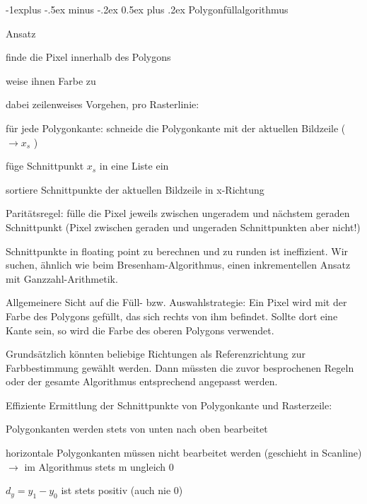 \documentclass[landscape]{article}
\makeatletter
\renewcommand{\subsection}{\@startsection{subsection}{2}{0mm}%
                                {-1explus -.5ex minus -.2ex}%
                                {0.5ex plus .2ex}%
                                {\normalfont\normalsize\bfseries}}
\makeatother
\begin{document}
\begin{multicols}{3}
  
  \subsection{ Polygonfüllalgorithmus}
  \begin{itemize*}
    \item Ansatz
          \begin{itemize*}
            \item finde die Pixel innerhalb des Polygons
            \item weise ihnen Farbe zu
            \item dabei zeilenweises Vorgehen, pro Rasterlinie:
            \item für jede Polygonkante: schneide die Polygonkante mit der aktuellen Bildzeile ($\rightarrow x_s$ )
            \item füge Schnittpunkt $x_s$ in eine Liste ein
            \item sortiere Schnittpunkte der aktuellen Bildzeile in x-Richtung
            \item Paritätsregel: fülle die Pixel jeweils zwischen ungeradem und nächstem geraden Schnittpunkt (Pixel zwischen geraden und ungeraden Schnittpunkten aber nicht!)
          \end{itemize*}
    \item Schnittpunkte in floating point zu berechnen und zu runden ist ineffizient. Wir suchen, ähnlich wie beim Bresenham-Algorithmus, einen inkrementellen Ansatz mit Ganzzahl-Arithmetik.
    \item Allgemeinere Sicht auf die Füll- bzw. Auswahlstrategie: Ein Pixel wird mit der Farbe des Polygons gefüllt, das sich rechts von ihm befindet. Sollte dort eine Kante sein, so wird die Farbe des oberen Polygons verwendet.
    \item Grundsätzlich könnten beliebige Richtungen als Referenzrichtung zur Farbbestimmung gewählt werden. Dann müssten die zuvor besprochenen Regeln oder der gesamte Algorithmus entsprechend angepasst werden.
    \item Effiziente Ermittlung der Schnittpunkte von Polygonkante und Rasterzeile:
          \begin{itemize*}
            \item Polygonkanten werden stets von unten nach oben bearbeitet
            \item horizontale Polygonkanten müssen nicht bearbeitet werden (geschieht in Scanline) $\rightarrow$ im Algorithmus stets m ungleich 0
            \item $d_y = y_1 - y_0$ ist stets positiv (auch nie 0)

\end{itemize*}
\end{itemize*}
\end{multicols}
\end{document}
